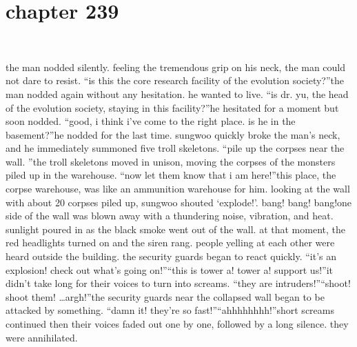 \section{chapter 239}

                             




the man nodded silently.
 feeling the tremendous grip on his neck, the man could not dare to resist.
“is this the core research facility of the evolution society?”the man nodded again without any hesitation.
 he wanted to live.
“is dr.
 yu, the head of the evolution society, staying in this facility?”he hesitated for a moment but soon nodded.
“good, i think i’ve come to the right place.
 is he in the basement?”he nodded for the last time.
 sungwoo quickly broke the man’s neck, and he immediately summoned five troll skeletons.
“pile up the corpses near the wall.
”the troll skeletons moved in unison, moving the corpses of the monsters piled up in the warehouse.
“now let them know that i am here!”this place, the corpse warehouse, was like an ammunition warehouse for him.
 looking at the wall with about 20 corpses piled up, sungwoo shouted ‘explode!’.
bang! bang! bang!one side of the wall was blown away with a thundering noise, vibration, and heat.
 sunlight poured in as the black smoke went out of the wall.
at that moment, the red headlights turned on and the siren rang.
 people yelling at each other were heard outside the building.
 the security guards began to react quickly.
“it’s an explosion! check out what’s going on!”“this is tower a! tower a! support us!”it didn’t take long for their voices to turn into screams.
“they are intruders!”“shoot! shoot them! …argh!”the security guards near the collapsed wall began to be attacked by something.
“damn it! they’re so fast!”“ahhhhhhhh!”short screams continued then their voices faded out one by one, followed by a long silence.
they were annihilated.

